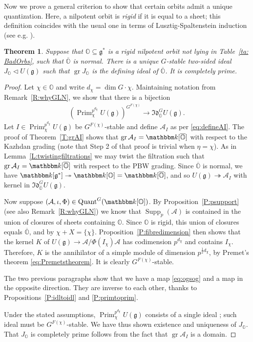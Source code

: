 \documentclass[twoside,12pt,reqno]{amsart}
\newtheorem{Theorem}{Theorem}[section]
\theoremstyle{remark}
\numberwithin{equation}{section}
\def\onto{\twoheadrightarrow}
\def\k{{\mathbbm k}}
\def\gr{\operatorname{gr}}
\def\Quant{\operatorname{Quant}}
\def\Prim{\operatorname{Prim}}
\def\Supp{\operatorname{Supp}}
\def\o{\overline}
\def\O{{\mathbb O}}
\def\cO{{\overline{\mathbb O}}}
\def\g{{\mathfrak g}}
\def\Idl{\mathfrak{Id}}
\def\cA{\mathcal{A}}
\newcommand{\A}{\mathcal{A}}
\begin{document}
Now we prove a general criterion to show that certain orbits admit a unique quantization. Here, a nilpotent orbit is {\em  rigid} if it is equal to a sheet; this definition coincides with the usual one in terms of Lusztig-Spaltenstein induction (see e.g. \cite{PS}).
\begin{Theorem}
\label{L:uniquequant}
  Suppose that $\O \subseteq \g^*$ is a rigid nilpotent orbit not lying in Table~\ref{ta: BadOrbs}, such that $\cO$ is normal. There is a unique $G$-stable two-sided ideal $J_\O \lhd U(\g)$ such that $\gr J_\O$ is the defining ideal of $\cO$. It is completely prime.
\end{Theorem}
\begin{proof}
    Let $\chi \in \O$ and write $d_\chi = \dim G\cdot \chi$. Maintaining notation from Remark~\ref{R:whyGLN}, we show that there is a bijection
    \begin{eqnarray}
        \label{eq:ogsog}
        \left(\Prim_\chi^{p^{d_\chi}}U(\g)\right)^{G^{F(\chi)}} \to \Idl_{\cO}^G U(\g).
    \end{eqnarray}
    Let $I\in \Prim_\chi^{p^{d_\chi}} U(\g)$ be $G^{F(\chi)}$-stable and define $\A_I$ as per \eqref{eq:defineAI}. The proof of Theorem~\ref{T:grAI} shows that $\gr \A_I = \k[\o\O]$ with respect to the Kazhdan grading (note that Step 2 of that proof is trivial when $\eta=\chi$).  As in Lemma~\ref{L:twistingfiltrations} we may twist the filtration such that $\gr \A_I = \k[\o\O]$ with respect to the PBW grading. Since $\cO$ is normal, we have $\k[\g^*] \onto \k[\O] = \k[\o\O]$, and so $U(\g) \onto \A_I$ with kernel in $\Idl_{\cO}^G U(\g)$.

    Now suppose $(\cA,\iota,\Phi)\in\Quant^G(\k[\O])$. By Proposition~\ref{P:psupport} (see also Remark~\ref{R:whyGLN}) we know that $\Supp_p(\A)$ is contained in the union of closures of sheets containing $\O$. Since $\O$ is rigid, this union of closures equals $\o\O$, and by \cite[Lemma 5.10]{BDT} $\chi+X=\{\chi\}$. Proposition~\ref{P:fibredimension} then shows that  the kernel $K$ of $U(\g) \to \A/\Phi(I_\chi)\cA$ has codimension $p^{d_\chi}$ and contains $I_\chi$. Therefore, $K$ is the annihilator of a simple module of dimension $p^{\frac{1}{2}d_\chi}$, by Premet's theorem \eqref{eq:Premetstheorem}. It is clearly $G^{F(\chi)}$-stable.

    The two previous paragraphs show that we have a map \eqref{eq:ogsog} and a map in the opposite direction. They are inverse to each other, thanks to Propositions~\ref{P:idltoidl} and \ref{P:primtoprim}. 

    Under the stated assumptions, $\Prim_\chi^{p^{d_\chi}} U(\g)$ consists of a single ideal \cite[Remark 5.5]{PT20}; such ideal must be $G^{F(\chi)}$-stable.  We have thus shown existence and uniqueness of $J_\O$. That $J_\O$ is completely prime follows from the fact that $\gr \A_I$ is a domain.
  

\end{proof}
\end{document}
